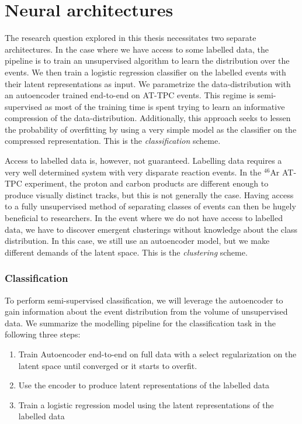 
\chapter{Neural architectures}\label{ch:architectures}

The research question explored in this thesis necessitates two separate architectures. In the case where we have access to some labelled data, the pipeline is to train an unsupervised algorithm to learn the distribution over the events. We then train a logistic regression classifier on the labelled events with their latent representations as input. We parametrize the data-distribution with an autoencoder trained end-to-end on AT-TPC events. This regime is semi-supervised as most of the training time is spent trying to learn an informative compression of the data-distribution. Additionally, this approach seeks to lessen the probability of overfitting by using a very simple model as the classifier on the compressed representation. This is the \textit{classification} scheme.

 Access to labelled data is, however, not guaranteed. Labelling data requires a very well determined system with very disparate reaction events. In the ${}^{46}$Ar AT-TPC experiment, the proton and carbon products are different enough to produce visually distinct tracks, but this is not generally the case. Having access to a fully unsupervised method of separating classes of events can then be hugely beneficial to researchers. In the event where we do not have access to labelled data, we have to discover emergent clusterings without knowledge about the class distribution. In this case, we still use an autoencoder model, but we make different demands of the latent space. This is the \textit{clustering} scheme. 

\subsection{Classification}
To perform semi-supervised classification, we will leverage the autoencoder to gain information about the event distribution from the volume of unsupervised data. We summarize the modelling pipeline for the classification task in the following three steps: 

\begin{enumerate}
\item Train Autoencoder end-to-end on full data with a select regularization on the latent space until converged or it starts to overfit. 
\item Use the encoder to produce latent representations of the labelled data 
\item Train a logistic regression model using the latent representations of the labelled data 
\end{enumerate}

